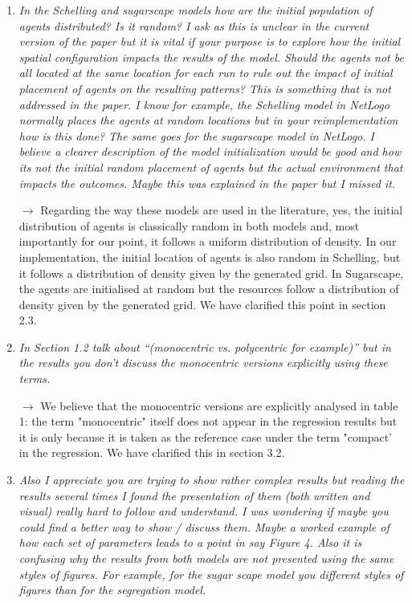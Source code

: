 \documentclass[11pt,a4paper,sans]{moderncv}        %
\begin{document}
\begin{enumerate}
	
	\item \textit{In the Schelling and sugarscape models how are the initial population of agents distributed? Is it random? I ask as this is unclear in the current version of the paper but it is vital if your purpose is to explore how the initial spatial configuration impacts the results of the model. Should the agents not be all located at the same location for each run to rule out the impact of initial placement of agents on the resulting patterns? This is something that is not addressed in the paper. I know for example, the Schelling model in NetLogo normally places the agents at random locations but in your reimplementation how is this done? The same goes for the sugarscape model in NetLogo. I believe a clearer description of the model initialization would be good and how its not the initial random placement of agents but the actual environment that impacts the outcomes. Maybe this was explained in the paper but I missed it.}
	
	\medskip
	
	$\rightarrow$ Regarding the way these models are used in the literature, yes, the initial distribution of agents is classically random in both models and, most importantly for our point, it follows a uniform distribution of density. In our implementation, the initial location of agents is also random in Schelling, but it follows a distribution of density given by the generated grid. In Sugarscape, the agents are initialised at random but the resources follow a distribution of density given by the generated grid. We have clarified this point in section 2.3.
         \bigskip
           
	\item  \textit{In Section 1.2 talk about “(monocentric vs. polycentric for example)” but in the results you don’t discuss the monocentric versions explicitly using these terms.}

	\medskip
	
	$\rightarrow$ We believe that the monocentric versions are explicitly analysed in table 1: the term "monocentric" itself does not appear in the regression results but it is only because it is taken as the reference case under the term "compact' in the regression. We have clarified this in section 3.2.
	\bigskip
	
	\item \textit{Also I appreciate you are trying to show rather complex results but reading the results several times I found the presentation of them (both written and visual) really hard to follow and understand. I was wondering if maybe you could find a better way to show / discuss them. Maybe a  worked example of how each set of parameters leads to a point in say Figure 4. Also it is confusing why the results from both models are not presented using the same styles of figures. For example, for the sugar scape model you different styles of figures than for the segregation model.}
	

\end{enumerate}
\end{document}

